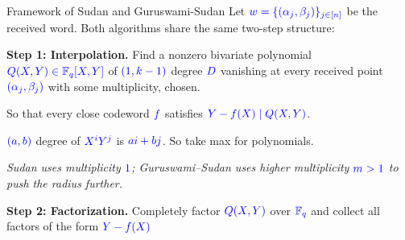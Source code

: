 \documentclass[10pt,handout]{beamer}
\begin{document}
\begin{frame}{Framework of Sudan and Guruswami-Sudan}
	Let $\textcolor{blue}{\textcolor{blue}{w = \{(\alpha_j, \beta_j)\}_{j\in[n]}}}$ be the received word. Both algorithms share the same two-step structure:\pause

	\vspace{0.5em}
	\textbf{Step 1: Interpolation.}
	Find a nonzero bivariate polynomial $\textcolor{blue}{\textcolor{blue}{Q(X,Y) \in \mathbb{F}_q[X,Y]}}$ of $\textcolor{blue}{(1,k-1)}$ degree $\textcolor{blue}{D}$ vanishing at every received point $\textcolor{blue}{\textcolor{blue}{(\alpha_j, \beta_j)}}$ with some multiplicity, chosen. 

	So that every close codeword $\textcolor{blue}{\textcolor{blue}{f}}$ satisfies $\textcolor{blue}{\textcolor{blue}{Y - f(X) \mid Q(X,Y)}}$.\pause
	
	$\textcolor{blue}{(a,b)}$ degree of $\textcolor{blue}{X^iY^j}$ is $\textcolor{blue}{ai+bj}$. So take max for polynomials.

	\vspace{0.3em}
	\textit{Sudan uses multiplicity $\textcolor{blue}{\textcolor{blue}{1}}$; Guruswami--Sudan uses higher multiplicity $\textcolor{blue}{\textcolor{blue}{m>1}}$ to push the radius further.}\pause

	\vspace{0.5em}
	\textbf{Step 2: Factorization.}
	Completely factor $\textcolor{blue}{\textcolor{blue}{Q(X,Y)}}$ over $\textcolor{blue}{\textcolor{blue}{\mathbb{F}_q}}$ and collect all factors of the form $\textcolor{blue}{\textcolor{blue}{Y - f(X)}}$
\end{frame}
\end{document}
